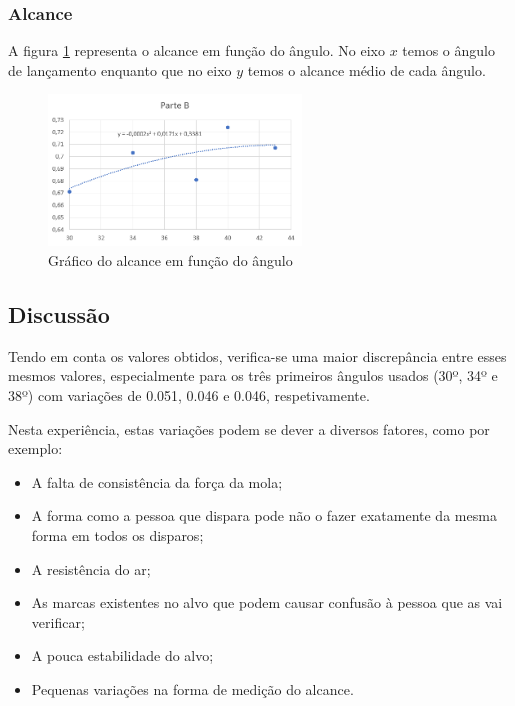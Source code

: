 {\subsubsection{Alcance}
\label{subsec:analise-discussao-parte2-alcance}

A figura \ref{fig:parte2-chart} representa o alcance em função do ângulo. No eixo $x$ temos o ângulo de lançamento enquanto que no eixo $y$ temos o alcance médio de cada ângulo.

\begin{figure}[ht]
    \centering
    \includegraphics[width=0.6\textwidth]{images/parte2chart.png}
    \caption{Gráfico do alcance em função do ângulo}
    \label{fig:parte2-chart}
\end{figure}

\subsection{Discussão}
\label{subsec:analise-discussao-parte2-discussao}

Tendo em conta os valores obtidos, verifica-se uma maior discrepância entre esses mesmos valores, especialmente para os três primeiros ângulos usados (30º, 34º e 38º) com variações de 0.051, 0.046 e 0.046, respetivamente.\bigskip

Nesta experiência, estas variações podem se dever a diversos fatores, como por exemplo:
\begin{itemize}
    \item A falta de consistência da força da mola;
    \item A forma como a pessoa que dispara pode não o fazer exatamente da mesma forma em todos os disparos;
    \item A resistência do ar;
    \item As marcas existentes no alvo que podem causar confusão à pessoa que as vai verificar;
    \item A pouca estabilidade do alvo;
    \item Pequenas variações na forma de medição do alcance.
\end{itemize}\bigskip

}

